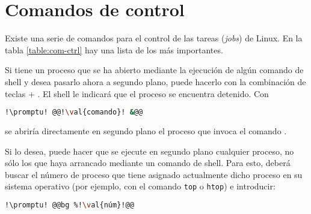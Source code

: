 \section{Comandos de control}\label{sec:com-ctrl}
Existe una serie de comandos para el control de las tareas (\foreignlanguage{english}{\textit{jobs}}) de
Linux. En la tabla \ref{table:com-ctrl} hay una lista de los más importantes.

Si tiene un proceso que se ha abierto mediante la ejecución de algún comando de shell y desea pasarlo ahora a
segundo plano, puede hacerlo con la combinación de teclas  + . El shell le indicará que el
proceso se encuentra detenido. Con

\begin{lstlisting}[gobble=2,language=bash,style=bashinteract,escapechar=!]
  !\promptu! @@!\val{comando}! &@@
\end{lstlisting}

\noindent se abriría directamente en segundo plano el proceso que invoca el comando .

Si lo desea, puede hacer que se ejecute en segundo plano cualquier proceso, no sólo los que haya arrancado
mediante un comando de shell. Para esto, deberá buscar el número de proceso  que tiene asignado
actualmente dicho proceso en su sistema operativo (por ejemplo, con el comando \lstinline!top! o
\lstinline!htop!) e introducir:

\begin{lstlisting}[gobble=2,language=bash,style=bashinteract,escapechar=!]
  !\promptu! @@bg %!\val{núm}!@@
\end{lstlisting}

